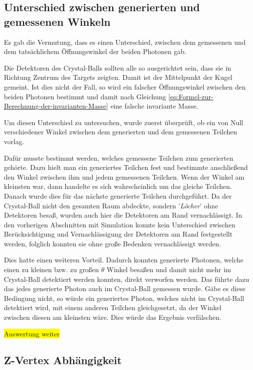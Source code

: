 \documentclass[a4paper,11pt,oneside,final,german,openbib,pdftex]{scrbook}
\begin{document}
{\subsection{Unterschied zwischen generierten und gemessenen Winkeln}
\label{sec:Unterschied-tatsaechlicher-gemessener-Winkel}

Es gab die Vermutung, dass es einen Unterschied, zwischen dem gemessenen und dem tatsächlichem Öffnungswinkel der beiden Photonen gab.

Die Detektoren des Crystal-Balls sollten alle so ausgerichtet sein, dass sie in Richtung Zentrum des Targets zeigten. Damit ist der Mittelpunkt der Kugel gemeint. Ist dies nicht der Fall, so wird ein falscher Öffnungswinkel zwischen den beiden Photonen bestimmt und damit nach Gleichung \ref{eq:Formel-zur-Berechnung-der-invarianten-Masse} eine falsche invariante Masse.

Um diesen Unterschied zu untersuchen, wurde zuerst überprüft, ob ein von Null verschiedener Winkel zwischen dem generierten und dem gemessenen Teilchen vorlag.

Dafür musste bestimmt werden, welches gemessene Teilchen zum generierten gehörte. Dazu hielt man ein generiertes Teilchen fest und bestimmte anschließend den Winkel zwischen ihm und jedem gemessenen Teilchen. Wenn der Winkel am kleinsten war, dann handelte es sich wahrscheinlich um das gleiche Teilchen. Danach wurde dies für das nächste generierte Teilchen durchgeführt. Da der Crystal-Ball nicht den gesamten Raum abdeckte, sondern '\textit{Löcher}' ohne Detektoren besaß, wurden auch hier die Detektoren am Rand vernachlässigt. In den vorherigen Abschnitten mit Simulation konnte kein Unterschied zwischen Berücksichtigung und Vernachlässigung der Detektoren am Rand festgestellt werden, folglich konnten sie ohne große Bedenken vernachlässigt werden.

 
Dies hatte einen weiteren Vorteil. Dadurch konnten generierte Photonen, welche einen zu kleinen bzw. zu großen $\theta$ Winkel besaßen und damit nicht mehr im Crystal-Ball detektiert werden konnten, direkt verworfen werden. Das führte dazu das jedes generierte Photon auch im Crystal-Ball gemessen wurde. Gäbe es diese Bedingung nicht, so würde ein generiertes Photon, welches nicht im Crystal-Ball detektiert wird, mit einem anderen Teilchen gleichgesetzt, da der Winkel zwischen diesen am kleinsten wäre. Dies würde das Ergebnis verfälschen. 

\colorbox{yellow}{Auswertung weiter}

\subsection{Z-Vertex Abh\"angigkeit}
\label{sec:Z-Vertex-Abhaengigkeit}

}
\end{document}
